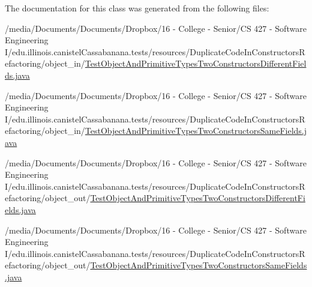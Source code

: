 The documentation for this class was generated from the following files:\begin{DoxyCompactItemize}
\item 
/media/Documents/Documents/Dropbox/16 -\/ College -\/ Senior/CS 427 -\/ Software Engineering I/edu.illinois.canistelCassabanana.tests/resources/DuplicateCodeInConstructorsRefactoring/object\_\-in/\hyperlink{object__in_2TestObjectAndPrimitiveTypesTwoConstructorsDifferentFields_8java}{TestObjectAndPrimitiveTypesTwoConstructorsDifferentFields.java}\item 
/media/Documents/Documents/Dropbox/16 -\/ College -\/ Senior/CS 427 -\/ Software Engineering I/edu.illinois.canistelCassabanana.tests/resources/DuplicateCodeInConstructorsRefactoring/object\_\-in/\hyperlink{object__in_2TestObjectAndPrimitiveTypesTwoConstructorsSameFields_8java}{TestObjectAndPrimitiveTypesTwoConstructorsSameFields.java}\item 
/media/Documents/Documents/Dropbox/16 -\/ College -\/ Senior/CS 427 -\/ Software Engineering I/edu.illinois.canistelCassabanana.tests/resources/DuplicateCodeInConstructorsRefactoring/object\_\-out/\hyperlink{object__out_2TestObjectAndPrimitiveTypesTwoConstructorsDifferentFields_8java}{TestObjectAndPrimitiveTypesTwoConstructorsDifferentFields.java}\item 
/media/Documents/Documents/Dropbox/16 -\/ College -\/ Senior/CS 427 -\/ Software Engineering I/edu.illinois.canistelCassabanana.tests/resources/DuplicateCodeInConstructorsRefactoring/object\_\-out/\hyperlink{object__out_2TestObjectAndPrimitiveTypesTwoConstructorsSameFields_8java}{TestObjectAndPrimitiveTypesTwoConstructorsSameFields.java}\end{DoxyCompactItemize}

